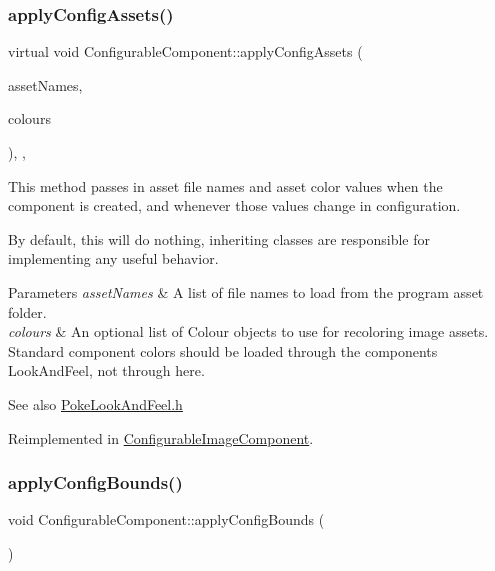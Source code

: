 \subsubsection{\texorpdfstring{apply\+Config\+Assets()}{applyConfigAssets()}}
{\footnotesize\ttfamily virtual void Configurable\+Component\+::apply\+Config\+Assets (\begin{DoxyParamCaption}\item[{String\+Array}]{asset\+Names,  }\item[{Array$<$ Colour $>$}]{colours }\end{DoxyParamCaption})\hspace{0.3cm}{\ttfamily [inline]}, {\ttfamily [protected]}, {\ttfamily [virtual]}}

This method passes in asset file names and asset color values when the component is created, and whenever those values change in configuration.

By default, this will do nothing, inheriting classes are responsible for implementing any useful behavior.


\begin{DoxyParams}{Parameters}
{\em asset\+Names} & A list of file names to load from the program asset folder.\\
\hline
{\em colours} & An optional list of Colour objects to use for recoloring image assets. Standard component colors should be loaded through the component\textquotesingle{}s Look\+And\+Feel, not through here.\\
\hline
\end{DoxyParams}
\begin{DoxySeeAlso}{See also}
\mbox{\hyperlink{PokeLookAndFeel_8h}{Poke\+Look\+And\+Feel.\+h}} 
\end{DoxySeeAlso}


Reimplemented in \mbox{\hyperlink{classConfigurableImageComponent_ad7670a14df8fd20780f91d85db2ec542}{Configurable\+Image\+Component}}.

\mbox{\label{classConfigurableComponent_ad6a11482af604e0f93699c1c24e39fba}} 
\subsubsection{\texorpdfstring{apply\+Config\+Bounds()}{applyConfigBounds()}}
{\footnotesize\ttfamily void Configurable\+Component\+::apply\+Config\+Bounds (\begin{DoxyParamCaption}{ }\end{DoxyParamCaption})\hspace{0.3cm}{\ttfamily [virtual]}}


